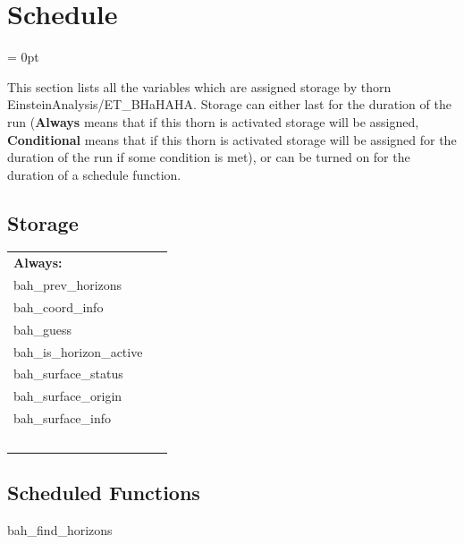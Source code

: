 
\section{Schedule} 


\parskip = 0pt


\noindent This section lists all the variables which are assigned storage by thorn EinsteinAnalysis/ET\_BHaHAHA.  Storage can either last for the duration of the run ({\bf Always} means that if this thorn is activated storage will be assigned, {\bf Conditional} means that if this thorn is activated storage will be assigned for the duration of the run if some condition is met), or can be turned on for the duration of a schedule function.


\subsection*{Storage}

\hspace{5mm}

 \begin{tabular*}{160mm}{ll} 

{\bf Always:}&  ~ \\ 
 bah\_prev\_horizons & ~\\ 
 bah\_coord\_info & ~\\ 
 bah\_guess & ~\\ 
 bah\_is\_horizon\_active & ~\\ 
 bah\_surface\_status & ~\\ 
 bah\_surface\_origin & ~\\ 
 bah\_surface\_info & ~\\ 
~ & ~\\ 
\end{tabular*} 


\subsection*{Scheduled Functions}
\vspace{5mm}


\hspace{5mm} bah\_find\_horizons 

\hspace{5mm}{\it driver function for bhahaha } 


\hspace{5mm}

